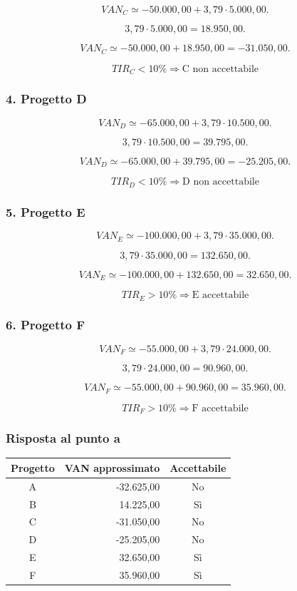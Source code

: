 \[
VAN_C
\simeq
-50.000{,}00+3{,}79\cdot5.000{,}00.
\]

\[
3{,}79\cdot5.000{,}00
=
18.950{,}00.
\]

\[
VAN_C
\simeq
-50.000{,}00+18.950{,}00
=
\boxed{-31.050{,}00}.
\]

\[
\boxed{
TIR_C<10\%
\Rightarrow
\text{C non accettabile}
}
\]


\subsubsection*{4. Progetto D}

\[
VAN_D
\simeq
-65.000{,}00+3{,}79\cdot10.500{,}00.
\]

\[
3{,}79\cdot10.500{,}00
=
39.795{,}00.
\]

\[
VAN_D
\simeq
-65.000{,}00+39.795{,}00
=
\boxed{-25.205{,}00}.
\]

\[
\boxed{
TIR_D<10\%
\Rightarrow
\text{D non accettabile}
}
\]


\subsubsection*{5. Progetto E}

\[
VAN_E
\simeq
-100.000{,}00+3{,}79\cdot35.000{,}00.
\]

\[
3{,}79\cdot35.000{,}00
=
132.650{,}00.
\]

\[
VAN_E
\simeq
-100.000{,}00+132.650{,}00
=
\boxed{32.650{,}00}.
\]

\[
\boxed{
TIR_E>10\%
\Rightarrow
\text{E accettabile}
}
\]


\subsubsection*{6. Progetto F}

\[
VAN_F
\simeq
-55.000{,}00+3{,}79\cdot24.000{,}00.
\]

\[
3{,}79\cdot24.000{,}00
=
90.960{,}00.
\]

\[
VAN_F
\simeq
-55.000{,}00+90.960{,}00
=
\boxed{35.960{,}00}.
\]

\[
\boxed{
TIR_F>10\%
\Rightarrow
\text{F accettabile}
}
\]


\subsubsection*{Risposta al punto a}

\begin{center}
    \begin{tabular}{|c|r|c|}
        \hline
        \textbf{Progetto}
        & \textbf{VAN approssimato}
        & \textbf{Accettabile} \\
        \hline
        A & -32.625,00 & No \\
        B & 14.225,00 & Sì \\
        C & -31.050,00 & No \\
        D & -25.205,00 & No \\
        E & 32.650,00 & Sì \\
        F & 35.960,00 & Sì \\
        \hline
    \end{tabular}
\end{center}

